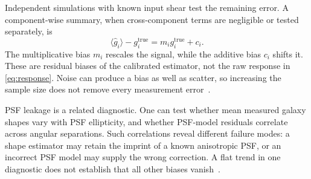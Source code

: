 Independent simulations with known input shear test the remaining error. A component-wise summary, when cross-component terms are negligible or tested separately, is
\begin{equation}
    \langle\widehat g_i\rangle-g_i^{\mathrm{true}}
    =m_i g_i^{\mathrm{true}}+c_i.
    \label{eq:shear-bias}
\end{equation}
The multiplicative bias $m_i$ rescales the signal, while the additive bias $c_i$ shifts it. These are residual biases of the calibrated estimator, not the raw response in \cref{eq:response}. Noise can produce a bias as well as scatter, so increasing the sample size does not remove every measurement error~\cite{refregier_noise_2012,mandelbaum_weak_2018}.

PSF leakage is a related diagnostic. One can test whether mean measured galaxy shapes vary with PSF ellipticity, and whether PSF-model residuals correlate across angular separations. Such correlations reveal different failure modes: a shape estimator may retain the imprint of a known anisotropic PSF, or an incorrect PSF model may supply the wrong correction. A flat trend in one diagnostic does not establish that all other biases vanish~\cite{rowe_improving_2010,saha_lensing_2026-1}.
